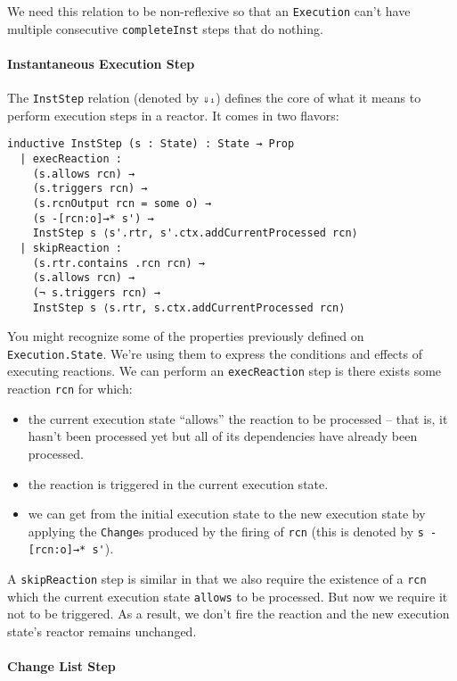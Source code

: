 We need this relation to be non-reflexive so that an \lstinline{Execution} can't have multiple consecutive \lstinline{completeInst} steps that do nothing.

\paragraph{Instantaneous Execution Step}

The \lstinline{InstStep} relation (denoted by \lstinline{⇓ᵢ}) defines the core of what it means to perform execution steps in a reactor.
It comes in two flavors:

\begin{lstlisting}
inductive InstStep (s : State) : State → Prop 
  | execReaction : 
    (s.allows rcn) →
    (s.triggers rcn) →
    (s.rcnOutput rcn = some o) →
    (s -[rcn:o]→* s') →
    InstStep s ⟨s'.rtr, s'.ctx.addCurrentProcessed rcn⟩
  | skipReaction :
    (s.rtr.contains .rcn rcn) →
    (s.allows rcn) →
    (¬ s.triggers rcn) →
    InstStep s ⟨s.rtr, s.ctx.addCurrentProcessed rcn⟩
\end{lstlisting}

You might recognize some of the properties previously defined on \lstinline{Execution.State}.
We're using them to express the conditions and effects of executing reactions.
We can perform an \lstinline{execReaction} step is there exists some reaction \lstinline{rcn} for which:

\begin{itemize}
  \item the current execution state ``allows'' the reaction to be processed -- that is, it hasn't been processed yet but all of its dependencies have already been processed.
  \item the reaction is triggered in the current execution state.
  \item we can get from the initial execution state to the new execution state by applying the \lstinline{Change}s produced by the firing of \lstinline{rcn} (this is denoted by \lstinline{s -[rcn:o]→* s'}).
\end{itemize}

A \lstinline{skipReaction} step is similar in that we also require the existence of a \lstinline{rcn} which the current execution state \lstinline{allows} to be processed.
But now we require it not to be triggered.
As a result, we don't fire the reaction and the new execution state's reactor remains unchanged.

\paragraph{Change List Step}


